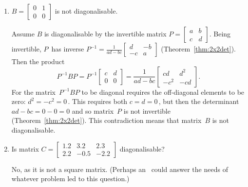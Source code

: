 \begin{example}
\begin{enumerate}
\item \label{eg:diagonaliseb}\(B=\begin{bmatrix} 0&1\\0&0 \end{bmatrix}\) is not diagonalisable.
\begin{solution} 
Assume \(B\) is diagonalisable by the invertible matrix \(P=\begin{bmatrix} a&b\\c&d \end{bmatrix}\).
Being invertible, \(P\)~has inverse \(P^{-1}=\frac1{ad-bc}\begin{bmatrix} d&-b\\-c&a \end{bmatrix}\)  (Theorem~\ref{thm:2x2det}).
Then the product
\begin{equation*}
P^{-1}BP=P^{-1}\begin{bmatrix} c&d\\0&0 \end{bmatrix}
=\frac1{ad-bc}\begin{bmatrix} cd&d^2\\-c^2&-cd \end{bmatrix}.
\end{equation*}
For the matrix~\(P^{-1}BP\) to be diagonal requires the off-diagonal elements to be zero: \(d^2=-c^2=0\)\,.
This requires both \(c=d=0\)\,, but then the determinant \(ad-bc=0-0=0\) and so matrix~\(P\) is not invertible (Theorem~\ref{thm:2x2det}).
This contradiction means that matrix~\(B\) is not diagonalisable.
\end{solution}

\item Is matrix \(C=\begin{bmatrix}1.2& 3.2& 2.3
\\   2.2&-0.5&-2.2\end{bmatrix}\) diagonalisable?
\begin{solution} 
No, as it is not a square matrix.
(Perhaps an \svd\ could answer the needs of whatever problem led to this question.) 
\end{solution}

\end{enumerate}
\end{example}


